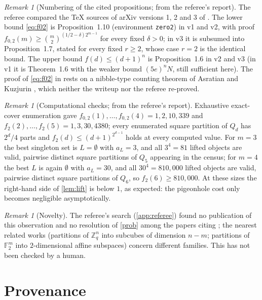 \documentclass[11pt,a4paper]{article}
\theoremstyle{plain}
\theoremstyle{definition}
\theoremstyle{remark}
\newtheorem{remark}[theorem]{Remark}
\begin{document}
\begin{remark}[Numbering of the cited propositions; from the referee's report]\label{rem:numbering}
The referee compared the TeX sources of arXiv versions 1, 2 and 3 of \cite{ABP}. The lower bound \eqref{eq:f02} is Proposition~1.10 (environment \texttt{zero2}) in v1 and v2, with proof $f_{0,2}(m)\ge\binom m2^{(1/2-\delta)2^{m-1}}$ for every fixed $\delta>0$; in v3 it is subsumed into Proposition~1.7, stated for every fixed $r\ge2$, whose case $r=2$ is the identical bound. The upper bound $f(d)\le(d+1)^n$ is Proposition~1.6 in v2 and v3 (in v1 it is Theorem~1.6 with the weaker bound $(5e)^nN$, still sufficient here). The proof of \eqref{eq:f02} in \cite{ABP} rests on a nibble-type counting theorem of Asratian and Kuzjurin \cite{AK}, which neither the writeup nor the referee re-proved.
\end{remark}

\begin{remark}[Computational checks; from the referee's report]\label{rem:comp}
Exhaustive exact-cover enumeration gave $f_{0,2}(1),\dots,f_{0,2}(4)=1,2,10,339$ and $f_2(2),\dots,f_2(5)=1,3,30,4380$; every enumerated square partition of $Q_d$ has $2^d/4$ parts and $f_2(d)\le(d+1)^{2^{d-1}}$ holds at every computed value. For $m=3$ the best singleton set is $L=\emptyset$ with $a_L=3$, and all $3^4=81$ lifted objects are valid, pairwise distinct square partitions of $Q_5$ appearing in the census; for $m=4$ the best $L$ is again $\emptyset$ with $a_L=30$, and all $30^4=810{,}000$ lifted objects are valid, pairwise distinct square partitions of $Q_6$, so $f_2(6)\ge810{,}000$. At these sizes the right-hand side of \cref{lem:lift} is below $1$, as expected: the pigeonhole cost only becomes negligible asymptotically.
\end{remark}

\begin{remark}[Novelty]
The referee's search (\cref{app:referee}) found no publication of this observation and no resolution of \cref{prob} among the papers citing \cite{ABP}; the nearest related works (partitions of $\mathbb Z_q^n$ into subcubes of dimension $n-m$; partitions of $\mathbb F_2^m$ into $2$-dimensional affine subspaces) concern different families. This has not been checked by a human.
\end{remark}

\section{Provenance}\label{sec:provenance}
\end{document}
